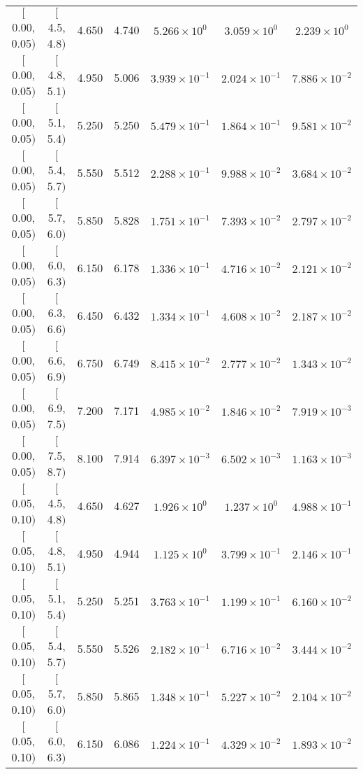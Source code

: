 \begin{longtable}{| c | c | c | c | c | c | c |}
\hline
\endlastfoot
$[$0.00, 0.05$)$ & $[$4.5, 4.8$)$ & 4.650 & 4.740 & $5.266 \times 10^{0}$ & $3.059 \times 10^{0}$ & $2.239 \times 10^{0}$ \\
$[$0.00, 0.05$)$ & $[$4.8, 5.1$)$ & 4.950 & 5.006 & $3.939 \times 10^{-1}$ & $2.024 \times 10^{-1}$ & $7.886 \times 10^{-2}$ \\
$[$0.00, 0.05$)$ & $[$5.1, 5.4$)$ & 5.250 & 5.250 & $5.479 \times 10^{-1}$ & $1.864 \times 10^{-1}$ & $9.581 \times 10^{-2}$ \\
$[$0.00, 0.05$)$ & $[$5.4, 5.7$)$ & 5.550 & 5.512 & $2.288 \times 10^{-1}$ & $9.988 \times 10^{-2}$ & $3.684 \times 10^{-2}$ \\
$[$0.00, 0.05$)$ & $[$5.7, 6.0$)$ & 5.850 & 5.828 & $1.751 \times 10^{-1}$ & $7.393 \times 10^{-2}$ & $2.797 \times 10^{-2}$ \\
$[$0.00, 0.05$)$ & $[$6.0, 6.3$)$ & 6.150 & 6.178 & $1.336 \times 10^{-1}$ & $4.716 \times 10^{-2}$ & $2.121 \times 10^{-2}$ \\
$[$0.00, 0.05$)$ & $[$6.3, 6.6$)$ & 6.450 & 6.432 & $1.334 \times 10^{-1}$ & $4.608 \times 10^{-2}$ & $2.187 \times 10^{-2}$ \\
$[$0.00, 0.05$)$ & $[$6.6, 6.9$)$ & 6.750 & 6.749 & $8.415 \times 10^{-2}$ & $2.777 \times 10^{-2}$ & $1.343 \times 10^{-2}$ \\
$[$0.00, 0.05$)$ & $[$6.9, 7.5$)$ & 7.200 & 7.171 & $4.985 \times 10^{-2}$ & $1.846 \times 10^{-2}$ & $7.919 \times 10^{-3}$ \\
$[$0.00, 0.05$)$ & $[$7.5, 8.7$)$ & 8.100 & 7.914 & $6.397 \times 10^{-3}$ & $6.502 \times 10^{-3}$ & $1.163 \times 10^{-3}$ \\
\hline
$[$0.05, 0.10$)$ & $[$4.5, 4.8$)$ & 4.650 & 4.627 & $1.926 \times 10^{0}$ & $1.237 \times 10^{0}$ & $4.988 \times 10^{-1}$ \\
$[$0.05, 0.10$)$ & $[$4.8, 5.1$)$ & 4.950 & 4.944 & $1.125 \times 10^{0}$ & $3.799 \times 10^{-1}$ & $2.146 \times 10^{-1}$ \\
$[$0.05, 0.10$)$ & $[$5.1, 5.4$)$ & 5.250 & 5.251 & $3.763 \times 10^{-1}$ & $1.199 \times 10^{-1}$ & $6.160 \times 10^{-2}$ \\
$[$0.05, 0.10$)$ & $[$5.4, 5.7$)$ & 5.550 & 5.526 & $2.182 \times 10^{-1}$ & $6.716 \times 10^{-2}$ & $3.444 \times 10^{-2}$ \\
$[$0.05, 0.10$)$ & $[$5.7, 6.0$)$ & 5.850 & 5.865 & $1.348 \times 10^{-1}$ & $5.227 \times 10^{-2}$ & $2.104 \times 10^{-2}$ \\
$[$0.05, 0.10$)$ & $[$6.0, 6.3$)$ & 6.150 & 6.086 & $1.224 \times 10^{-1}$ & $4.329 \times 10^{-2}$ & $1.893 \times 10^{-2}$ \\

\end{longtable}

